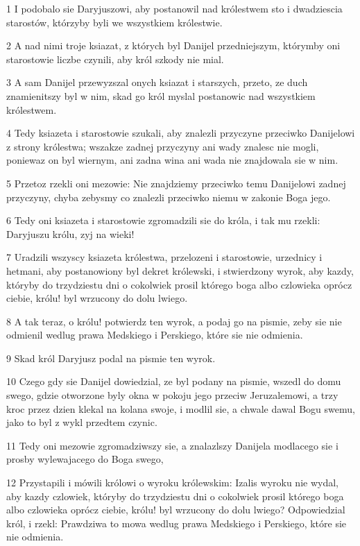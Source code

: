 \par 1 I podobalo sie Daryjuszowi, aby postanowil nad królestwem sto i dwadziescia starostów, którzyby byli we wszystkiem królestwie.
\par 2 A nad nimi troje ksiazat, z których byl Danijel przedniejszym, którymby oni starostowie liczbe czynili, aby król szkody nie mial.
\par 3 A sam Danijel przewyzszal onych ksiazat i starszych, przeto, ze duch znamienitszy byl w nim, skad go król myslal postanowic nad wszystkiem królestwem.
\par 4 Tedy ksiazeta i starostowie szukali, aby znalezli przyczyne przeciwko Danijelowi z strony królestwa; wszakze zadnej przyczyny ani wady znalesc nie mogli, poniewaz on byl wiernym, ani zadna wina ani wada nie znajdowala sie w nim.
\par 5 Przetoz rzekli oni mezowie: Nie znajdziemy przeciwko temu Danijelowi zadnej przyczyny, chyba zebysmy co znalezli przeciwko niemu w zakonie Boga jego.
\par 6 Tedy oni ksiazeta i starostowie zgromadzili sie do króla, i tak mu rzekli: Daryjuszu królu, zyj na wieki!
\par 7 Uradzili wszyscy ksiazeta królestwa, przelozeni i starostowie, urzednicy i hetmani, aby postanowiony byl dekret królewski, i stwierdzony wyrok, aby kazdy, któryby do trzydziestu dni o cokolwiek prosil którego boga albo czlowieka oprócz ciebie, królu! byl wrzucony do dolu lwiego.
\par 8 A tak teraz, o królu! potwierdz ten wyrok, a podaj go na pismie, zeby sie nie odmienil wedlug prawa Medskiego i Perskiego, które sie nie odmienia.
\par 9 Skad król Daryjusz podal na pismie ten wyrok.
\par 10 Czego gdy sie Danijel dowiedzial, ze byl podany na pismie, wszedl do domu swego, gdzie otworzone byly okna w pokoju jego przeciw Jeruzalemowi, a trzy kroc przez dzien klekal na kolana swoje, i modlil sie, a chwale dawal Bogu swemu, jako to byl z wykl przedtem czynic.
\par 11 Tedy oni mezowie zgromadziwszy sie, a znalazlszy Danijela modlacego sie i prosby wylewajacego do Boga swego,
\par 12 Przystapili i mówili królowi o wyroku królewskim: Izalis wyroku nie wydal, aby kazdy czlowiek, któryby do trzydziestu dni o cokolwiek prosil którego boga albo czlowieka oprócz ciebie, królu! byl wrzucony do dolu lwiego? Odpowiedzial król, i rzekl: Prawdziwa to mowa wedlug prawa Medskiego i Perskiego, które sie nie odmienia.
